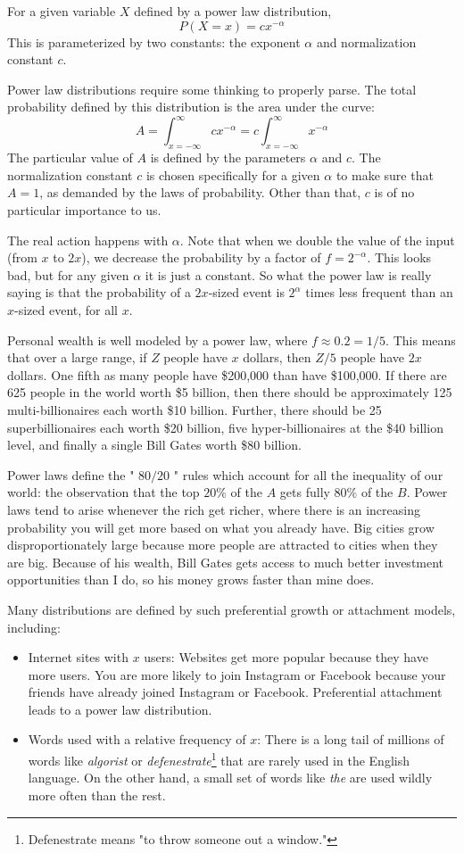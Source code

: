\documentclass[10pt]{article}
\begin{document}
For a given variable $X$ defined by a power law distribution,
\[
P(X=x)=c x^{-\alpha}
\]
This is parameterized by two constants: the exponent $\alpha$ and normalization constant $c$.

Power law distributions require some thinking to properly parse. The total probability defined by this distribution is the area under the curve:
\[
A=\int_{x=-\infty}^{\infty} c x^{-\alpha} = c \int_{x=-\infty}^{\infty} x^{-\alpha}
\]
The particular value of $A$ is defined by the parameters $\alpha$ and $c$. The normalization constant $c$ is chosen specifically for a given $\alpha$ to make sure that $A=1$, as demanded by the laws of probability. Other than that, $c$ is of no particular importance to us.

The real action happens with $\alpha$. Note that when we double the value of the input (from $x$ to $2 x$), we decrease the probability by a factor of $f=2^{-\alpha}$. This looks bad, but for any given $\alpha$ it is just a constant. So what the power law is really saying is that the probability of a $2 x$-sized event is $2^{\alpha}$ times less frequent than an $x$-sized event, for all $x$.

Personal wealth is well modeled by a power law, where $f \approx 0.2=1/5$. This means that over a large range, if $Z$ people have $x$ dollars, then $Z/5$ people have $2 x$ dollars. One fifth as many people have \$200,000 than have \$100,000. If there are 625 people in the world worth \$5 billion, then there should be approximately 125 multi-billionaires each worth \$10 billion. Further, there should be 25 superbillionaires each worth \$20 billion, five hyper-billionaires at the \$40 billion level, and finally a single Bill Gates worth \$80 billion.

Power laws define the " $80 / 20$ " rules which account for all the inequality of our world: the observation that the top $20 \%$ of the $A$ gets fully $80 \%$ of the $B$. Power laws tend to arise whenever the rich get richer, where there is an increasing probability you will get more based on what you already have. Big cities grow disproportionately large because more people are attracted to cities when they are big. Because of his wealth, Bill Gates gets access to much better investment opportunities than I do, so his money grows faster than mine does.

Many distributions are defined by such preferential growth or attachment models, including:
\begin{itemize}
  \item Internet sites with $x$ users: Websites get more popular because they have more users. You are more likely to join Instagram or Facebook because your friends have already joined Instagram or Facebook. Preferential attachment leads to a power law distribution.
  \item Words used with a relative frequency of $x$: There is a long tail of millions of words like \textit{algorist} or \textit{defenestrate}\footnote{Defenestrate means "to throw someone out a window."} that are rarely used in the English language. On the other hand, a small set of words like \textit{the} are used wildly more often than the rest.
\end{itemize}
\end{document}
